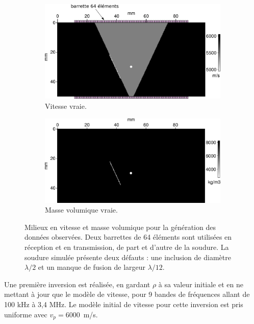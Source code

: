 \begin{figure}[!h]
	\centering
	\begin{subfigure}[b]{0.45\textwidth}
		\includegraphics[width=\textwidth]{img/milieux_ps/vp_true.png}
		\caption{Vitesse vraie.}
	\end{subfigure}
	\begin{subfigure}[b]{0.45\textwidth}
		\includegraphics[width=\textwidth]{img/milieux_ps/rho_true.png}
		\caption{Masse volumique vraie.}
	\end{subfigure}
	\caption{Milieux en vitesse et masse volumique pour la génération des données observées. Deux barrettes de 64 éléments sont utilisées en réception et en transmission, de part et d'autre de la soudure. La soudure simulée présente deux défauts : une inclusion de diamètre $\lambda/2$ et un manque de fusion de largeur $\lambda/12$.\label{app:iso:model}}
\end{figure}


Une première inversion est réalisée, en gardant $\rho$ à sa valeur initiale et en ne mettant à jour que le modèle de vitesse, pour 9 bandes de fréquences allant de 100 kHz à 3,4 MHz. Le modèle initial de vitesse pour cette inversion est pris uniforme avec $v_{p}=6000$~m/s.\\

